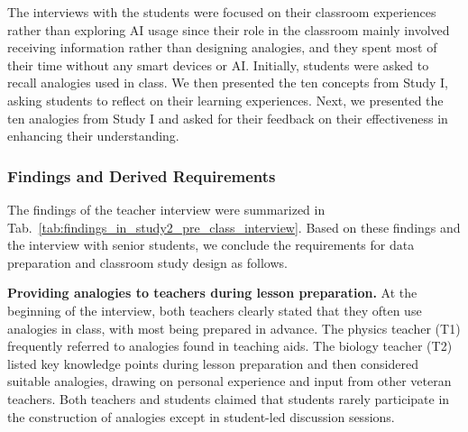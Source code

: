 The interviews with the students were focused on their classroom experiences rather than exploring AI usage since their role in the classroom mainly involved receiving information rather than designing analogies, and they spent most of their time without any smart devices or AI.
Initially, students were asked to recall analogies used in class. 
We then presented the ten concepts from Study I, asking students to reflect on their learning experiences. 
Next, we presented the ten analogies from Study I and asked for their feedback on their effectiveness in enhancing their understanding.




\subsubsection{Findings and Derived Requirements}
\label{sec:study21_findings_and_derived_requirments}
%

The findings of the teacher interview were summarized in Tab.~\ref{tab:findings_in_study2_pre_class_interview}.
Based on these findings and the interview with senior students, we conclude the requirements for data preparation and classroom study design as follows.

\textbf{Providing analogies to teachers during lesson preparation.}
At the beginning of the interview, both teachers clearly stated that they often use analogies in class, with most being prepared in advance. 
The physics teacher (T1) frequently referred to analogies found in teaching aids. 
The biology teacher (T2) listed key knowledge points during lesson preparation and then considered suitable analogies, drawing on personal experience and input from other veteran teachers. 
Both teachers and students claimed that students rarely participate in the construction of analogies except in student-led discussion sessions.



